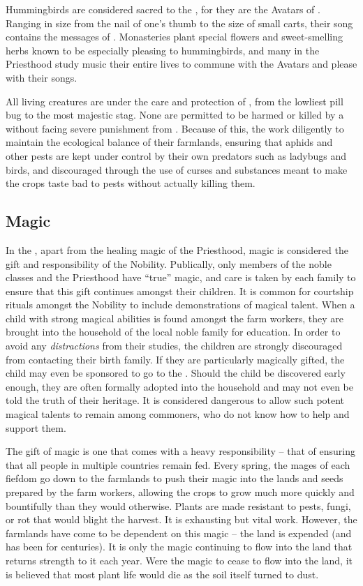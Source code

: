 \documentclass[blue]{GL2020}
\begin{document}
Hummingbirds are considered sacred to the \pFarmers{}, for they are the Avatars of \cFarmGod{}.  Ranging in size from the nail of one's thumb to the size of small carts, their song contains the messages of \cFarmGod{}.  Monasteries plant special flowers and sweet-smelling herbs known to be especially pleasing to hummingbirds, and many in the Priesthood study music their entire lives to commune with the Avatars and please \cFarmGod{} with their songs.

All living creatures are under the care and protection of \cFarmGod{}, from the lowliest pill bug to the most majestic stag.  None are permitted to be harmed or killed by a \pFarmer{} without facing severe punishment from \cFarmGod{}.  Because of this, the \pFarm{} work diligently to maintain the ecological balance of their farmlands, ensuring that aphids and other pests are kept under control by their own predators such as ladybugs and birds, and discouraged through the use of curses and substances meant to make the crops taste bad to pests without actually killing them. 

\subsection*{Magic}
In the \pFarm{}, apart from the healing magic of the Priesthood, magic is considered the gift and responsibility of the Nobility.  Publically, only members of the noble classes and the Priesthood have ``true'' magic, and care is taken by each family to ensure that this gift continues amongst their children.  It is common for courtship rituals amongst the Nobility to include demonstrations of magical talent.  When a child with strong magical abilities is found amongst the farm workers, they are brought into the household of the local noble family for education.  In order to avoid any \emph{distractions} from their studies, the children are strongly discouraged from contacting their birth family.  If they are particularly magically gifted, the child may even be sponsored to go to the \pSchool{}.  Should the child be discovered early enough, they are often formally adopted into the household and may not even be told the truth of their heritage.  It is considered dangerous to allow such potent magical talents to remain among commoners, who do not know how to help and support them.  

The gift of magic is one that comes with a heavy responsibility – that of ensuring that all people in multiple countries remain fed.  Every spring, the mages of each fiefdom go down to the farmlands to push their magic into the lands and seeds prepared by the farm workers, allowing the crops to grow much more quickly and bountifully than they would otherwise.  Plants are made resistant to pests, fungi, or rot that would blight the harvest.  It is exhausting but vital work.  However, the farmlands have come to be dependent on this magic -- the land is expended (and has been for centuries).  It is only the magic continuing to flow into the land that returns strength to it each year.  Were the magic to cease to flow into the land, it is believed that most plant life would die as the soil itself turned to dust.
\end{document}
